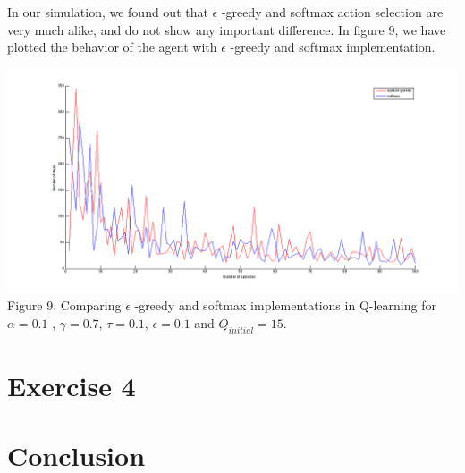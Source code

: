 \documentclass[a4paper,11pt]{article}
\begin{document}
In our simulation, we found out that $\epsilon$ -greedy and softmax action selection are very much alike, and do not show any important difference. In figure 9, we have plotted the behavior of the agent with $\epsilon$ -greedy and softmax implementation.

\begin{center}
\includegraphics[width=1.0\textwidth,height=0.4\textheight]{s1e1.png}
\label{Figure 1}
Figure 9. Comparing $\epsilon$ -greedy and softmax implementations in Q-learning for $\alpha = 0.1$ , $\gamma = 0.7$, $\tau = 0.1$, $\epsilon = 0.1$ and $Q_{initial} = 15$.
\end{center}
\section*{Exercise 4}




\section*{Conclusion}
\end{document}
